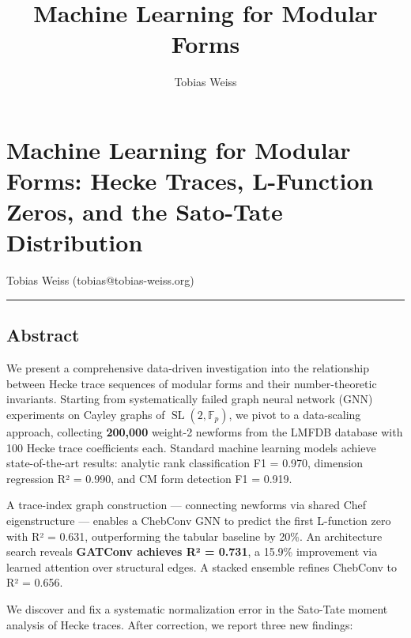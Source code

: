 \documentclass[
]{article}
\title{Machine Learning for Modular Forms}
\author{Tobias Weiss}
\date{}
\begin{document}
\maketitle

\hypertarget{machine-learning-for-modular-forms-hecke-traces-l-function-zeros-and-the-sato-tate-distribution}{%
\section{Machine Learning for Modular Forms: Hecke Traces, L-Function
Zeros, and the Sato-Tate
Distribution}\label{machine-learning-for-modular-forms-hecke-traces-l-function-zeros-and-the-sato-tate-distribution}}

Tobias Weiss (tobias@tobias-weiss.org)

\begin{center}\rule{0.5\linewidth}{0.5pt}\end{center}

\hypertarget{abstract}{%
\subsection{Abstract}\label{abstract}}

We present a comprehensive data-driven investigation into the
relationship between Hecke trace sequences of modular forms and their
number-theoretic invariants. Starting from systematically failed graph
neural network (GNN) experiments on Cayley graphs of
\(\operatorname{SL}(2,\mathbb{F}_p)\), we pivot to a data-scaling
approach, collecting \textbf{200,000} weight-2 newforms from the LMFDB
database with 100 Hecke trace coefficients each. Standard machine
learning models achieve state-of-the-art results: analytic rank
classification F1 = 0.970, dimension regression R² = 0.990, and CM form
detection F1 = 0.919.

A trace-index graph construction --- connecting newforms via shared Chef
eigenstructure --- enables a ChebConv GNN to predict the first
L-function zero with R² = 0.631, outperforming the tabular baseline by
20\%. An architecture search reveals \textbf{GATConv achieves R² =
0.731}, a 15.9\% improvement via learned attention over structural
edges. A stacked ensemble refines ChebConv to R² = 0.656.

We discover and fix a systematic normalization error in the Sato-Tate
moment analysis of Hecke traces. After correction, we report three new
findings:
\end{document}
